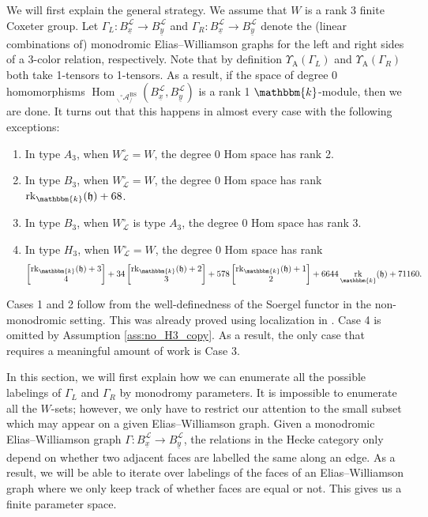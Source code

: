 \documentclass{amsart}
\renewcommand{\k}{\mathbbm{k}}
\newcommand{\scrL}{\mathcal{L}}
\DeclareMathOperator{\Hom}{Hom}
\DeclareMathOperator{\rk}{rk}
\newcommand{\fr}[1]{\mathfrak{#1}}
\DeclareMathOperator{\Abe}{A}
\DeclareMathOperator{\BS}{BS}
\newcommand{\grAmon}[2]{\:_{#1 \backslash} \!\! {}^{\circ} \mathcal{A}_{/ #2} }
\newcommand{\ux}{\underline{x}}
\newcommand{\uy}{\underline{y}}
\renewcommand{\binom}[2]{\begin{bmatrix} #1 \\ #2 \end{bmatrix}}
\theoremstyle{definition}
\numberwithin{equation}{subsection}
\begin{document}
We will first explain the general strategy. We assume that $W$ is a rank 3 finite Coxeter group.
Let $\Gamma_L : B_{\ux}^{\scrL} \to B_{\uy}^{\scrL}$ and $\Gamma_R : B_{\ux}^{\scrL} \to B_{\uy}^{\scrL}$ denote the (linear combinations of) monodromic Elias--Williamson graphs for the left and right sides of a 3-color relation, respectively. 
Note that by definition $\Upsilon_{\Abe} (\Gamma_L)$ and $\Upsilon_{\Abe} (\Gamma_R)$ both take 1-tensors to 1-tensors. As a result, if the space of degree 0 homomorphisms $\Hom_{\grAmon{}{}^{\BS}} (B_{\ux}^{\scrL}, B_{\uy}^{\scrL})$ is a rank 1 $\k$-module, then we are done.
It turns out that this happens in almost every case with the following exceptions:
\begin{enumerate}
    \item[(Case 1)] In type $A_3$, when $W_{\scrL}^{\circ} = W$, the degree 0 Hom space has rank 2. 
    \item[(Case 2)] In type $B_3$, when $W_{\scrL}^{\circ} = W$, the degree 0 Hom space has rank $\rk_{\k} (\fr{h}) + 68$. 
    \item[(Case 3)] In type $B_3$, when $W_{\scrL}^{\circ}$ is type $A_3$, the degree 0 Hom space has rank 3.
    \item[(Case 4)] In type $H_3$, when $W_{\scrL}^{\circ} = W$, the degree 0 Hom space has rank
    \[  \binom{\rk_{\k} (\fr{h}) +3}{4} + 34 \binom{\rk_{\k} (\fr{h}) +2}{3} + 578 \binom{\rk_{\k} (\fr{h}) +1}{2} + 6644 \rk_{\k} (\fr{h}) + 71160.\] 
\end{enumerate}
Cases 1 and 2 follow from the well-definedness of the Soergel functor in the non-monodromic setting. This was already proved using localization in \cite{EW}.
Case 4 is omitted by Assumption \ref{ass:no_H3_copy}.
As a result, the only case that requires a meaningful amount of work is Case 3. 

In this section, we will first explain how we can enumerate all the possible labelings of $\Gamma_L$ and $\Gamma_R$ by monodromy parameters.
It is impossible to enumerate all the $W$-sets; however, we only have to restrict our attention to the small subset which may appear on a given Elias--Williamson graph.
Given a monodromic Elias--Williamson graph $\Gamma : B_{\ux}^{\scrL} \to B_{\uy}^{\scrL}$, the relations in the Hecke category only depend on whether two adjacent faces are labelled the same along an edge.
As a result, we will be able to iterate over labelings of the faces of an Elias--Williamson graph where we only keep track of whether faces are equal or not.
This gives us a finite parameter space. 
\end{document}

